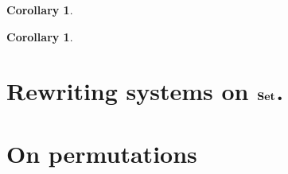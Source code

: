 \documentclass[a4paper]{article}
\def\Set{\textbf {\textup{Set}}}
\newtheorem{corollary}[theorem]{Corollary}
\theoremstyle{definition}
\begin{document}
\begin{corollary}
\end{corollary}

\begin{corollary}
\end{corollary}


\section{Rewriting systems on $\Set$.}\label{app:set}

\section{On permutations}\label{app:perm}
\end{document}

